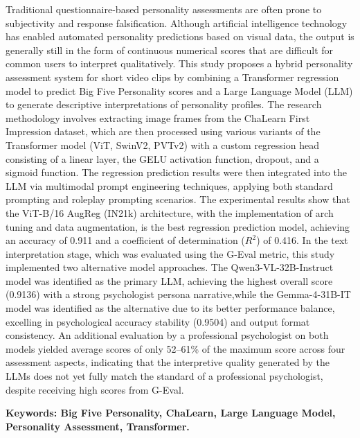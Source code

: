 Traditional questionnaire-based personality assessments are often prone to subjectivity and response falsification. Although artificial intelligence technology has enabled automated personality predictions based on visual data, the output is generally still in the form of continuous numerical scores that are difficult for common users to interpret qualitatively. This study proposes a hybrid personality assessment system for short video clips by combining a Transformer regression model to predict Big Five Personality scores and a Large Language Model (LLM) to generate descriptive interpretations of personality profiles. The research methodology involves extracting image frames from the ChaLearn First Impression dataset, which are then processed using various variants of the Transformer model (ViT, SwinV2, PVTv2) with a custom regression head consisting of a linear layer, the GELU activation function, dropout, and a sigmoid function. The regression prediction results were then integrated into the LLM via multimodal prompt engineering techniques, applying both standard prompting and roleplay prompting scenarios. The experimental results show that the ViT-B/16 AugReg (IN21k) architecture, with the implementation of arch tuning and data augmentation, is the best regression prediction model, achieving an accuracy of 0.911 and a coefficient of determination ($R^2$) of 0.416. In the text interpretation stage, which was evaluated using the G-Eval metric, this study implemented two alternative model approaches. The Qwen3-VL-32B-Instruct model was identified as the primary LLM, achieving the highest overall score (0.9136) with a strong psychologist persona narrative,while the Gemma-4-31B-IT model was identified as the alternative due to its better performance balance, excelling in psychological accuracy stability (0.9504) and output format consistency. An additional evaluation by a professional psychologist on both models yielded average scores of only 52–61\% of the maximum score across four assessment aspects, indicating that the interpretive quality generated by the LLMs does not yet fully match the standard of a professional psychologist, despite receiving high scores from G-Eval.

\noindent
\textbf{Keywords: Big Five Personality, ChaLearn, Large Language Model, Personality Assessment, Transformer.}
